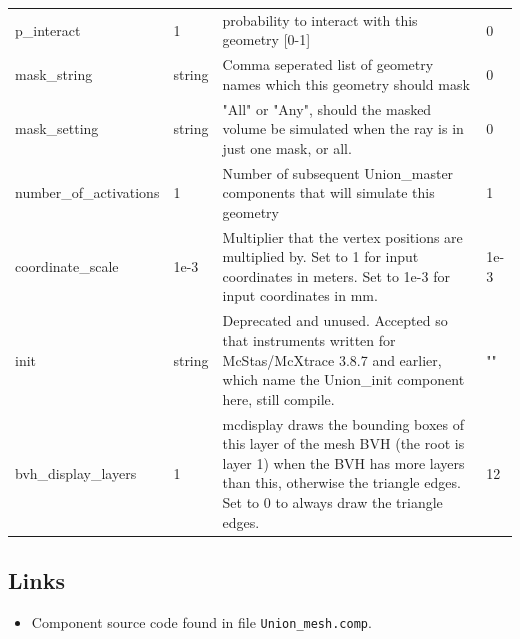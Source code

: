 \begin{longtable}{p{}p{}p{}p{}}
p\_interact & 1 & probability to interact with this geometry [0-1] & 0 \\
mask\_string & string & Comma seperated list of geometry names which this geometry should mask & 0 \\
mask\_setting & string & "All" or "Any", should the masked volume be simulated when the ray is in just one mask, or all. & 0 \\
number\_of\_activations & 1 & Number of subsequent Union\_master components that will simulate this geometry & 1 \\
coordinate\_scale & 1e-3 & Multiplier that the vertex positions are multiplied by. Set to 1 for input coordinates in meters. Set to 1e-3 for input coordinates in mm. & 1e-3 \\
init & string & Deprecated and unused. Accepted so that instruments written for McStas/McXtrace 3.8.7 and earlier, which name the Union\_init component here, still compile. & "" \\
bvh\_display\_layers & 1 & mcdisplay draws the bounding boxes of this layer of the mesh BVH (the root is layer 1) when the BVH has more layers than this, otherwise the triangle edges. Set to 0 to always draw the triangle edges. & 12 \\
\bottomrule
\end{longtable}

\subsection*{Links}
\begin{itemize}
  \item Component source code found in file \texttt{Union\_mesh.comp}.
\end{itemize}
